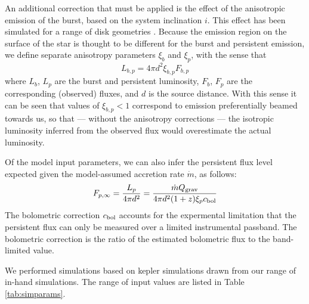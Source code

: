 \documentclass{aastex61}
\begin{document}
An additional correction that must be applied is the effect of the anisotropic emission of the burst, based on the system inclination $i$. This effect has been simulated for a range of disk geometries \cite[e.g.][]{he16}. Because the emission region on the surface of the star is thought to be different for the burst and persistent emission, we define separate anisotropy parameters $\xi_b$ and $\xi_p$, with the sense that
\begin{equation}
L_{b,p} = 4\pi d^2\xi_{b,p}F_{b,p}
\end{equation}
where $L_b$, $L_p$ are the burst and persistent luminosity, $F_b$, $F_p$ are the corresponding (observed) fluxes, and $d$ is the source distance. With this sense it can be seen that values of $\xi_{b,p}<1$ correspond to emission preferentially beamed towards us, so that --- without the anisotropy corrections --- the isotropic luminosity inferred from the observed flux would overestimate the actual luminosity.

Of the model input parameters, we can also infer the persistent flux level expected given the model-assumed accretion rate $\dot{m}$, as follows: %
\begin{equation}
F_{p,\infty} = \frac{L_p}{4\pi d^2} = 
\frac{\dot{m} Q_{\rm grav}}{4\pi d^2 (1+z)\xi_p c_{\rm bol}}
\end{equation}
%
The bolometric correction $c_{\rm bol}$ accounts for the expermental limitation that the persistent flux can only be measured over a limited instrumental passband. The bolometric correction is the ratio of the estimated bolometric flux to the band-limited value.

We performed simulations based on {\sc kepler} simulations drawn from our range of in-hand simulations. The range of input values are listed in Table \ref{tab:simparams}.
\end{document}
